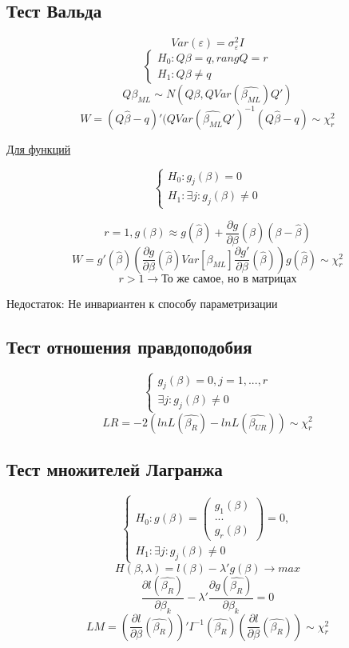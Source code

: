 \documentclass[a4paper, 12pt]{article}
\begin{document}
\subsection{Тест Вальда}

\[Var(\varepsilon) = \sigma^{2}_{\varepsilon}I\]
\[\begin{cases}
    H_{0}: Q\beta = q, rangQ = r \\
    H_{1}: Q\beta \neq q
\end{cases}\]
\[Q\beta_{ML} \sim N(Q\beta, QVar(\hat{\beta_{ML}})Q')\]
\[W = (Q\hat{\beta} - q)'(QVar(\hat{\beta_{ML}}Q')^{-1}(Q\hat{\beta} - q) \sim \chi^{2}_{r}\]

\underline{Для функций}

\[\begin{cases}
    H_{0}: g_{j}(\beta) = 0
    \\
    H_{1}: \exists j: g_{j}(\beta) \neq 0
\end{cases}\]

\[r = 1, g(\beta) \approx g(\hat{\beta}) + \frac{\partial g}{\partial \beta}(\hat{\beta})(\beta - \hat{\beta})\]
\[W = g'(\hat{\beta})\left(\frac{\partial g}{\partial \beta}(\hat{\beta})Var[\hat{\beta_{ML}}]\frac{\partial g'}{\partial \beta}(\hat{\beta})\right)g(\hat{\beta}) \sim \chi^{2}_{r}\]
\[r > 1 \rightarrow \textrm{То же самое, но в матрицах}\]

\begin{center}
    Недостаток: Не инвариантен к способу параметризации
\end{center}

\subsection{Тест отношения правдоподобия}

\[\begin{cases}
    g_{j}(\beta) = 0, j = 1, ..., r
    \\
    \exists j: g_{j}(\beta) \neq 0
\end{cases}\]
\[LR = -2(lnL(\hat{\beta_{R}}) - lnL(\hat{\beta_{UR}})) \sim \chi^{2}_{r}\]

\subsection{Тест множителей Лагранжа}

\[\begin{cases}
    H_{0}: g(\beta) = \begin{pmatrix}g_{1}(\beta) \\ ... \\ g_{r}(\beta) \end{pmatrix} = 0,
    \\
    H_{1}: \exists j: g_{j}(\beta) \neq 0
\end{cases}\]
\[
    H(\beta, \lambda) = l(\beta) - \lambda'g(\beta) \rightarrow max
\]
\[
    \frac{\partial l(\hat{\beta_{R}})}{\partial \beta_{k}} - \lambda' \frac{\partial g(\hat{\beta_{R}})}{\partial \beta_{k}} = 0
\]
\[LM = \left(\frac{\partial l}{\partial \beta}(\hat{\beta_{R}})\right)'I^{-1}(\hat{\beta_{R}})\left(\frac{\partial l}{\partial \beta}(\hat{\beta_{R}})\right) \sim \chi^{2}_{r}\]
\end{document}

